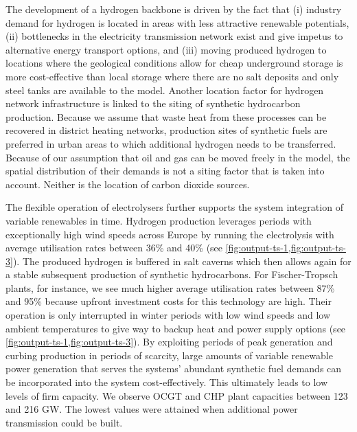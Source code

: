 The development of a hydrogen backbone is driven by the fact that (i) industry
demand for hydrogen is located in areas with less attractive renewable
potentials, (ii) bottlenecks in the electricity transmission network exist and
give impetus to alternative energy transport options, and (iii) moving produced
hydrogen to locations where the geological conditions allow for cheap
underground storage is more cost-effective than local storage where there are no
salt deposits and only steel tanks are available to the model. Another location
factor for hydrogen network infrastructure is linked to the siting of synthetic
hydrocarbon production. Because we assume that waste heat from these processes
can be recovered in district heating networks, production sites of synthetic
fuels are preferred in urban areas to which additional hydrogen needs to be
transferred. Because of our assumption that oil and gas can be moved freely in
the model, the spatial distribution of their demands is not a siting factor that
is taken into account. Neither is the location of carbon dioxide sources.

The flexible operation of electrolysers further supports the system integration
of variable renewables in time. Hydrogen production leverages periods with
exceptionally high wind speeds across Europe by running the electrolysis with
average utilisation rates between 36\% and 40\% (see
\cref{fig:output-ts-1,fig:output-ts-3}).  The produced hydrogen is buffered in
salt caverns which then allows again for a stable subsequent production of
synthetic hydrocarbons. For Fischer-Tropsch plants, for instance, we see much
higher average utilisation rates between 87\% and 95\% because upfront
investment costs for this technology are high. Their operation is only
interrupted in winter periods with low wind speeds and low ambient temperatures
to give way to backup heat and power supply options (see
\cref{fig:output-ts-1,fig:output-ts-3}). By exploiting periods of peak
generation and curbing production in periods of scarcity, large amounts of
variable renewable power generation that serves the systems' abundant synthetic
fuel demands can be incorporated into the system cost-effectively. This
ultimately leads to low levels of firm capacity. We observe OCGT and CHP plant
capacities between 123 and 216 GW\el. The lowest values were attained when
additional power transmission could be built.


